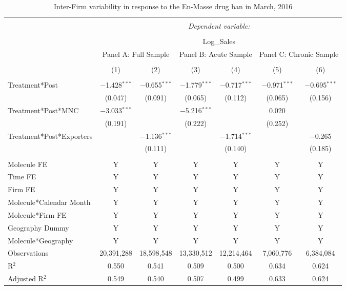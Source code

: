 \documentclass[AER]{AEA}
\theoremstyle{theorem}
\begin{document}
\begin{table}[h!] \centering
	\caption{Inter-Firm variability in response to the En-Masse drug ban in March, 2016} 
	\label{Table-R-3} 
	\footnotesize
\begin{tabular}{@{\extracolsep{1pt}}lcccccc} 
	\\[-1.8ex]\hline 
	\hline \\[-1.8ex] 
	& \multicolumn{6}{c}{\textit{Dependent variable:}} \\ 
	\cline{2-7} 
	\\[-1.8ex] & \multicolumn{6}{c}{Log\_Sales} \\ 
	& \multicolumn{2}{c}{Panel A: Full Sample} & \multicolumn{2}{c}{Panel B: Acute Sample} & \multicolumn{2}{c}{Panel C: Chronic Sample} \\ 
	\\[-1.8ex] & (1) & (2) & (3) & (4) & (5) & (6)\\ 
	\hline \\[-1.8ex] 
	Treatment*Post & $-$1.428$^{***}$ & $-$0.655$^{***}$ & $-$1.779$^{***}$ & $-$0.717$^{***}$ & $-$0.971$^{***}$ & $-$0.695$^{***}$ \\ 
	& (0.047) & (0.091) & (0.065) & (0.112) & (0.065) & (0.156) \\ 
	Treatment*Post*MNC & $-$3.033$^{***}$ &  & $-$5.216$^{***}$ &  & 0.020 &  \\ 
	& (0.191) &  & (0.222) &  & (0.252) &  \\ 
	Treatment*Post*Exporters &  & $-$1.136$^{***}$ &  & $-$1.714$^{***}$ &  & $-$0.265 \\ 
	&  & (0.111) &  & (0.140) &  & (0.185) \\ 
	\hline \\[-1.8ex] 
	Molecule FE & Y & Y & Y & Y & Y & Y \\ 
	Time FE & Y & Y & Y & Y & Y & Y \\ 
	Firm FE & Y & Y & Y & Y & Y & Y \\ 
	Molecule*Calendar Month & Y & Y & Y & Y & Y & Y \\ 
	Molecule*Firm FE & Y & Y & Y & Y & Y & Y \\ 
	Geography Dummy & Y & Y & Y & Y & Y & Y \\ 
	Molecule*Geography & Y & Y & Y & Y & Y & Y \\ 
	Observations & 20,391,288 & 18,598,548 & 13,330,512 & 12,214,464 & 7,060,776 & 6,384,084 \\ 
	R$^{2}$ & 0.550 & 0.541 & 0.509 & 0.500 & 0.634 & 0.624 \\ 
	Adjusted R$^{2}$ & 0.549 & 0.540 & 0.507 & 0.499 & 0.633 & 0.624 \\ 

\end{tabular}
\end{table}
\end{document}
